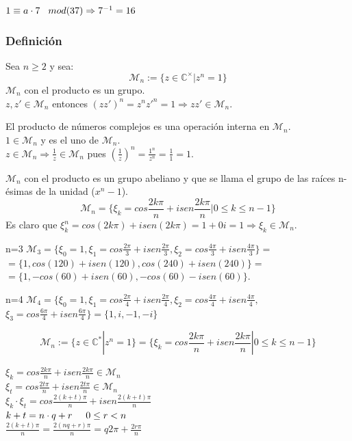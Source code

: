 \documentclass[11pt,a4paper]{article}
\begin{document}
$1 \equiv a \cdot 7 \hspace{0.3cm} mod(37) \Rightarrow 7^{-1} = 16$

\subsubsection*{Definición}

Sea $n \geq 2$ y sea:
$$\mathcal{M}_{n} := \{z \in \mathbb{C}^{\times} | z^{n} = 1\}$$
$\mathcal{M}_{n}$ con el producto es un grupo. \\
$z, z' \in \mathcal{M}_{n}$ entonces $(zz')^{n} = z^{n}z'^{n} = 1 \Rightarrow zz' \in \mathcal{M}_{n}$.
 
El producto de números complejos es una operación interna en $\mathcal{M}_{n}$. \\
$1 \in \mathcal{M}_{n}$ y es el uno de $\mathcal{M}_{n}$. \\
$z \in \mathcal{M}_{n} \Rightarrow \frac{1}{z} \in \mathcal{M}_{n}$ pues $(\frac{1}{z})^{n} = \frac{1^{n}}{z^{n}} = \frac{1}{1} = 1$.

$\mathcal{M}_{n}$ con el producto es un grupo abeliano y que se llama el grupo de las raíces n-ésimas de la unidad ($x^{n}-1$).
$$\mathcal{M}_{n} = \{\xi_{k} = cos \frac{2k\pi}{n} + isen\frac{2k\pi}{n} | 0 \leq k \leq n-1\}$$
Es claro que $\xi_{k}^{n} = cos(2k\pi) + i sen(2k\pi) = 1 + 0i = 1 \Rightarrow \xi_{k} \in \mathcal{M}_{n}$.

\begin{enumerate*}
\item[n=3] $\mathcal{M}_{3} = \{ \xi_{0} = 1, \xi_{1} = cos\frac{2\pi}{3} + isen\frac{2\pi}{3}, \xi_{2} = cos\frac{4\pi}{3} + isen\frac{4\pi}{3}\} =$ \\ $= \{1, cos(120)+isen(120), cos(240) + isen(240)\} =$ \\ $= \{1, -cos(60) + isen(60), -cos(60) -i sen(60)\}$.
\item[n=4] $\mathcal{M}_{4} = \{ \xi_{0} = 1, \xi_{1} = cos\frac{2\pi}{4} + isen\frac{2\pi}{4}, \xi_{2} = cos\frac{4\pi}{4} + isen\frac{4\pi}{4}, $ \\ $\xi_{3} = cos\frac{6\pi}{4} + isen\frac{6\pi}{4}\} = \{1,i, -1, -i\}$
\end{enumerate*}


$$\mathcal{M}_{n} := \{z \in \mathbb{C}^{*}|z^{n} = 1\}=\{\xi_{k} = cos\frac{2k\pi}{n} + isen\frac{2k\pi}{n}| 0 \leq k \leq n-1\}$$

$\xi_{k} = cos\frac{2k\pi}{n} + isen\frac{2k\pi}{n} \in \mathcal{M}_{n}$ \\
$\xi_{t} = cos\frac{2t\pi}{n} + isen\frac{2t\pi}{n} \in \mathcal{M}_{n}$ \\
$\xi_{k} \cdot \xi_{t} = cos\frac{2(k+t)\pi}{n} + isen\frac{2(k+t)\pi}{n}$ \\
$k + t = n \cdot q + r \hspace{0.5cm} 0 \leq r < n$ \\
$\frac{2(k+t)\pi}{n} = \frac{2(nq + r)\pi}{n} = q2\pi + \frac{2r\pi}{n}$ 
\end{document}
